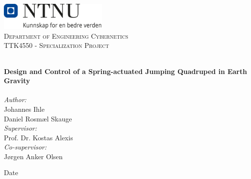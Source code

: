 
\begin{titlepage}
\vbox{ }
\vbox{ }
\begin{center}
\includegraphics[width=0.40\textwidth]{Images/NTNU_logo.png}\\[1cm]
\textsc{\LARGE Department of Engineering Cybernetics}\\[1.5cm]
\textsc{\Large TTK4550 - Specialization Project}\\[0.5cm]
\vbox{ }

\HRule \\[0.4cm]
{ \huge \bfseries Design and Control of a Spring-actuated Jumping Quadruped in Earth Gravity}\\[0.4cm]
\HRule \\[1.5cm]

\large
\emph{Author:}\\
Johannes Ihle\\
Daniel Rosmæl Skauge\\
\vspace{1em}
\emph{Supervisor:}\\
Prof. Dr. Kostas Alexis\\
\vspace{1em}
\emph{Co-supervisor:}\\
Jørgen Anker Olsen
\vfill

{\large Date}
\end{center}
\end{titlepage}